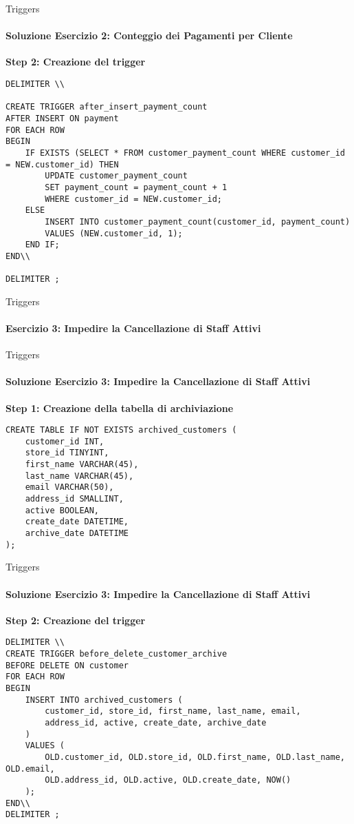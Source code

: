 %
\begin{frame}[fragile]{Triggers}
\framesubtitle{Soluzione Esercizio 2: Conteggio dei Pagamenti per Cliente}

\scriptsize

\vspace{-1cm}

\textbf{Step 2: Creazione del trigger}
\begin{lstlisting}
DELIMITER \\

CREATE TRIGGER after_insert_payment_count
AFTER INSERT ON payment
FOR EACH ROW
BEGIN
    IF EXISTS (SELECT * FROM customer_payment_count WHERE customer_id = NEW.customer_id) THEN
        UPDATE customer_payment_count
        SET payment_count = payment_count + 1
        WHERE customer_id = NEW.customer_id;
    ELSE
        INSERT INTO customer_payment_count(customer_id, payment_count)
        VALUES (NEW.customer_id, 1);
    END IF;
END\\

DELIMITER ;
\end{lstlisting}
\end{frame}
%
\begin{frame}[fragile]{Triggers}
\framesubtitle{Esercizio 3: Impedire la Cancellazione di Staff Attivi}
\consegnaTriggersExThree
\end{frame}
%
\begin{frame}[fragile]{Triggers}
\framesubtitle{Soluzione Esercizio 3: Impedire la Cancellazione di Staff Attivi}

\textbf{Step 1: Creazione della tabella di archiviazione}
\begin{lstlisting}
CREATE TABLE IF NOT EXISTS archived_customers (
    customer_id INT,
    store_id TINYINT,
    first_name VARCHAR(45),
    last_name VARCHAR(45),
    email VARCHAR(50),
    address_id SMALLINT,
    active BOOLEAN,
    create_date DATETIME,
    archive_date DATETIME
);

\end{lstlisting}

\end{frame}
%
\begin{frame}[fragile]{Triggers}
\framesubtitle{Soluzione Esercizio 3: Impedire la Cancellazione di Staff Attivi}

\vspace{-.5cm}
\small
\textbf{Step 2: Creazione del trigger}
\begin{lstlisting}
DELIMITER \\
CREATE TRIGGER before_delete_customer_archive
BEFORE DELETE ON customer
FOR EACH ROW
BEGIN
    INSERT INTO archived_customers (
        customer_id, store_id, first_name, last_name, email,
        address_id, active, create_date, archive_date
    )
    VALUES (
        OLD.customer_id, OLD.store_id, OLD.first_name, OLD.last_name, OLD.email,
        OLD.address_id, OLD.active, OLD.create_date, NOW()
    );
END\\
DELIMITER ;
\end{lstlisting}
\end{frame}
